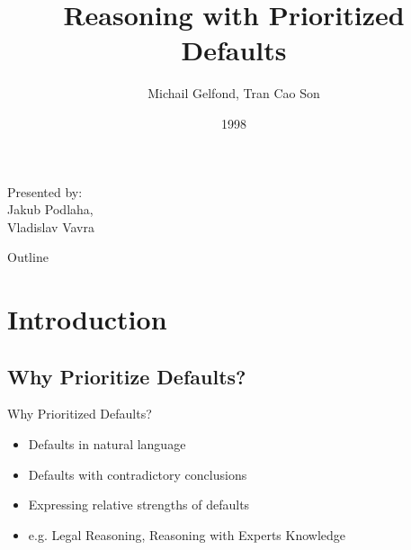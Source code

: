 \documentclass{beamer}
\title %
{Reasoning with Prioritized Defaults}
\author[Michail Gelfond, Tran Cao Son] %
{Michail Gelfond, Tran Cao Son}
\institute[Universities of Somewhere and Elsewhere] %
{
  Computer Science Department\\
  University of Texas at El Paso
}
\date[Short Occasion] %
{1998}
\begin{document}
\begin{frame}
  \titlepage

\begin{center}
\vspace{-30pt}
Presented by: \\
Jakub Podlaha, \\
Vladislav Vavra
\end{center}

\end{frame}

\begin{frame}{Outline}
  \tableofcontents
\end{frame}





\section{Introduction}

  \subsection[Motivation]{Why Prioritize Defaults?}

  \begin{frame}{Why Prioritized Defaults?} %
    \begin{itemize}
      \item Defaults in natural language
      \item Defaults with contradictory conclusions
      \item Expressing relative strengths of defaults
      \item e.g. Legal Reasoning, Reasoning with Experts Knowledge
    \end{itemize}
  \end{frame}
  
\end{document}
